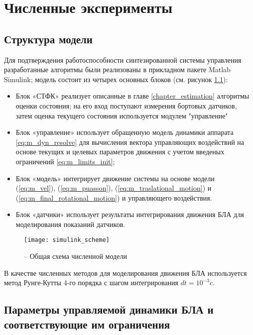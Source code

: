 
\chapter{Численные эксперименты}
\label{experiments_chapter}

\section{Структура модели}

Для подтверждения работоспособности синтезированной системы управления разработанные алгоритмы были реализованы в прикладном пакете Matlab Simulink; модель состоит из четырех основных блоков (см. рисунок \ref{fig:simulink_scheme}):
\begin{itemize}
	\item Блок «СТФК» реализует описанные в главе \ref{chapter_estimation} алгоритмы оценки состояния; на его вход поступают измерения бортовых датчиков, затем оценка текущего состояния используется модулем "управление"
	\item Блок «управление» использует обращенную модель динамики аппарата \ref{eq:m_dyn_resolve} для вычисления вектора управляющих воздействий на основе текущих и целевых параметров движения с учетом введеных ограничений \ref{eq:m_limits_init};
	\item Блок «модель» интегрирует движение системы на основе модели
	(\ref{eq:m_vel}), (\ref{eq:m_puasson}), (\ref{eq:m_traslational_motion}) и (\ref{eq:m_final_rotational_motion})
	и управляющего воздействия.
	\item Блок «датчики» использует результаты интегрирования движения БЛА для моделирования показаний датчиков.
\end{itemize}
\begin{figure}[h!]
	\centering
	\texttt{[image: simulink\_scheme]}
	\caption{ -- Общая схема численной модели}
	\label{fig:simulink_scheme}
\end{figure}
В качестве численных методов для моделирования движения БЛА используется метод Рунге-Кутты 4-го порядка с шагом интегрирования $dt={10^{-3}}$c.

\section{Параметры управляемой динамики БЛА и соответствующие им ограничения}

